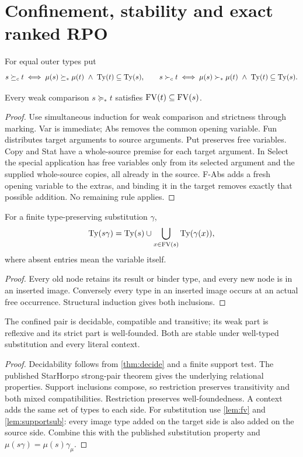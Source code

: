 \documentclass[11pt,a4paper]{article}
\begin{document}
\section{Confinement, stability and exact ranked RPO}
\begin{definition}
For equal outer types put
\[
 s\succeq_c t\iff\mu(s)\succeq_*\mu(t)\ \land\ \Ty(t)\subseteq\Ty(s),
 \qquad
 s\succ_c t\iff\mu(s)\succ_*\mu(t)\ \land\ \Ty(t)\subseteq\Ty(s).
\]
\end{definition}
\begin{lemma}\label{lem:fv}
Every weak comparison $s\succeq_*t$ satisfies $\operatorname{FV}(t)\subseteq\operatorname{FV}(s)$.
\end{lemma}
\begin{proof}
Use simultaneous induction for weak comparison and strictness through marking.
Var is immediate; Abs removes the common opening variable.  Fun distributes
target arguments to source arguments.  Put preserves free variables.
Copy and Stat have a whole-source premise for each target argument.
In Select the special application has free variables only from its selected
argument and the supplied whole-source copies, all already in the source.
F-Abs adds a fresh opening variable to the extras, and binding it in the
target removes exactly that possible addition.  No remaining rule applies.
\end{proof}
\begin{lemma}\label{lem:supportsub}
For a finite type-preserving substitution $\gamma$,
\[
 \operatorname{Ty}(s\gamma)=\operatorname{Ty}(s)\cup\bigcup_{x\in\operatorname{FV}(s)}\operatorname{Ty}(\gamma(x)),
\]
where absent entries mean the variable itself.
\end{lemma}
\begin{proof}
Every old node retains its result or binder type, and every new node is in an
inserted image.  Conversely every type in an inserted image occurs at an
actual free occurrence.  Structural induction gives both inclusions.
\end{proof}
\begin{theorem}\label{thm:stable}
The confined pair is decidable, compatible and transitive; its weak part is
reflexive and its strict part is well-founded.  Both are stable under
well-typed substitution and every literal context.
\end{theorem}
\begin{proof}
Decidability follows from \ref{thm:decide} and a finite support test.
The published StarHorpo strong-pair theorem gives the underlying relational
properties.  Support inclusions compose, so restriction preserves
transitivity and both mixed compatibilities.  Restriction preserves
well-foundedness.  A context adds the same set of types to each side.
For substitution use \ref{lem:fv} and \ref{lem:supportsub}: every image type added
on the target side is also added on the source side.  Combine this with the
published substitution property and $\mu(s\gamma)=\mu(s)\gamma_\mu$.
\end{proof}
\end{document}
